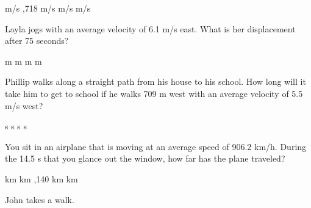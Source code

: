 \documentclass[]{exam}
\begin{document}
\begin{questions}
\begin{questions}
\begin{choices}
 m/s
,718 m/s
 m/s
 m/s
\end{choices}

\question %
Layla jogs with an average velocity of 6.1 m/s east. What is her displacement after 75 seconds?

\begin{choices}
 m
 m
 m
 m
\end{choices}

\question %
Phillip walks along a straight path from his house to his school. How long will it take him to get to school if he walks 709 m west with an average velocity of 5.5 m/s west?


\begin{choices}
 s
 s
 s
 s
\end{choices}



\question %
You sit in an airplane that is moving at an average speed of 906.2 km/h. During the 14.5 s that you glance out the window, how far has the plane traveled?

\begin{choices}
 km
 km
,140 km
 km
\end{choices}









\question
John takes a walk.


\end{questions}
\end{questions}
\end{document}
